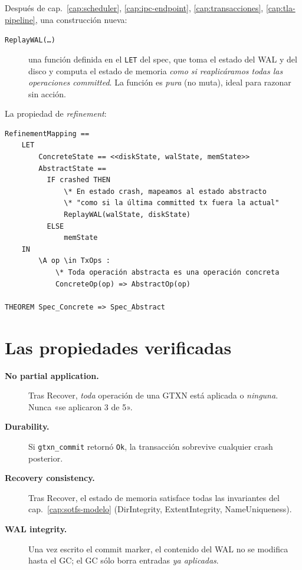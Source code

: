 Después de cap.~\ref{cap:scheduler}, \ref{cap:ipc-endpoint},
\ref{cap:transacciones}, \ref{cap:tla-pipeline}, una
construcción nueva:

\begin{description}
  \item[\texttt{ReplayWAL(\dots)}] una función definida en el
    \texttt{LET} del spec, que toma el estado del WAL y del disco
    y computa el estado de memoria \emph{como si reaplicáramos
    todas las operaciones committed}. La función es \emph{pura}
    (no muta), ideal para razonar sin acción.
\end{description}

La propiedad de \emph{refinement}:

\begin{lstlisting}[language=tla, frame=single, basicstyle=\ttfamily\scriptsize]
RefinementMapping ==
    LET
        ConcreteState == <<diskState, walState, memState>>
        AbstractState ==
          IF crashed THEN
              \* En estado crash, mapeamos al estado abstracto
              \* "como si la última committed tx fuera la actual"
              ReplayWAL(walState, diskState)
          ELSE
              memState
    IN
        \A op \in TxOps :
            \* Toda operación abstracta es una operación concreta
            ConcreteOp(op) => AbstractOp(op)

THEOREM Spec_Concrete => Spec_Abstract
\end{lstlisting}

\section{Las propiedades verificadas}

\begin{description}
  \item[\textbf{No partial application.}] Tras Recover,
    \emph{toda} operación de una GTXN está aplicada o
    \emph{ninguna}. Nunca «se aplicaron 3 de 5».
  \item[\textbf{Durability.}] Si \texttt{gtxn\_commit} retornó
    \texttt{Ok}, la transacción sobrevive cualquier crash
    posterior.
  \item[\textbf{Recovery consistency.}] Tras Recover, el estado
    de memoria satisface todas las invariantes del cap.~\ref{cap:sotfs-modelo}
    (DirIntegrity, ExtentIntegrity, NameUniqueness).
  \item[\textbf{WAL integrity.}] Una vez escrito el commit
    marker, el contenido del WAL no se modifica hasta el GC; el
    GC sólo borra entradas \emph{ya aplicadas}.
\end{description}

